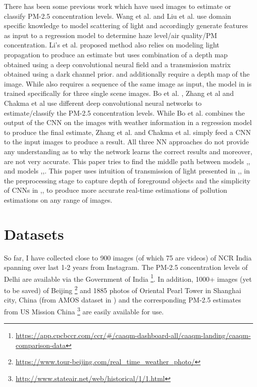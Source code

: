 \documentclass{article}
\begin{document}
There has been some previous work which have used images to estimate or classify PM-2.5 concentration levels. Wang et al. \cite{realtime} and Liu et al. \cite{PP} use domain specific knowledge to model scattering of light and accordingly generate features as input to a regression model to determine haze level/air quality/PM concentration. Li’s et al. \cite{Usergen} proposed method also relies on modeling light propagation to produce an estimate but uses combination of a depth map obtained using a deep convolutional neural field and a transmission matrix obtained using a dark channel prior. \cite{realtime} and \cite{PP} additionally require a depth map of the image. While \cite{realtime} also requires a sequence of the same image as input, the model in \cite{PP} is trained specifically for three single scene images.  Bo et al. \cite{PPconv}, Zhang et al \cite{EAPconv} and Chakma et al \cite{IBAQconv} use different deep convolutional neural networks to estimate/classify the PM-2.5 concentration levels. While Bo et al. \cite{PPconv} combines the output of the CNN on the images with weather information in a regression model to produce the final estimate, Zhang et al. \cite{EAPconv} and Chakma et al. \cite{EAPconv} simply feed a CNN to the input images to produce a result. All three NN approaches do not provide any understanding as to why the network learns the correct results and moreover, are not very accurate.
This paper tries to find the middle path between models \cite{realtime},\cite{PP},\cite{Usergen} and models \cite{PPconv},\cite{EAPconv},\cite{IBAQconv}. This paper uses intuition of transmission of light presented in \cite{realtime},\cite{PP},\cite{Usergen} in the preprocessing stage to capture depth of foreground objects and the simplicity of CNNs in \cite{PPconv},\cite{EAPconv},\cite{IBAQconv} to produce more accurate real-time estimations of pollution estimations on any range of images.

\section{Datasets}
\label{sec:Datasets} 

So far, I have collected close to 900 images (of which 75 are videos) of NCR India spanning over last 1-2 years from Instagram. The PM-2.5 concentration levels of Delhi are available via the Government of India \footnote{\url{https://app.cpcbccr.com/ccr/#/caaqm-dashboard-all/caaqm-landing/caaqm-comparison-data}}. In addition, 1000+ images (yet to be saved) of Beijing \footnote{\url{https://www.tour-beijing.com/real_time_weather_photo/}} and 1885 photos of Oriental Pearl Tower in Shanghai city, China (from AMOS dataset in \cite{PP}) and the corresponding PM-2.5 estimates from US Mission China \footnote{\url{http://www.stateair.net/web/historical/1/1.html}} are easily available for use.
\end{document}
